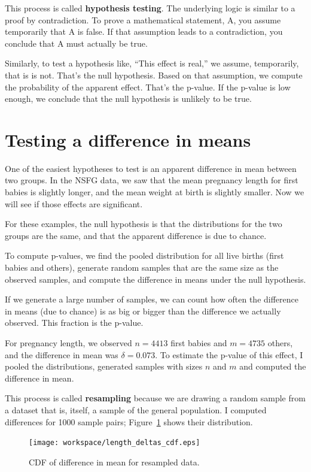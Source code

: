 \documentclass[12pt]{book}
\begin{document}
This process is called {\bf hypothesis testing}.  The underlying
logic is similar to a proof by contradiction.  To prove a mathematical
statement, A, you assume temporarily that A is false.  If that
assumption leads to a contradiction, you conclude that A must actually
be true.

Similarly, to test a hypothesis like, ``This effect is real,'' we
assume, temporarily, that is is not.  That's the null hypothesis.
Based on that assumption, we compute the probability of the apparent
effect.  That's the p-value.  If the p-value is low enough, we
conclude that the null hypothesis is unlikely to be true.


\section{Testing a difference in means}

One of the easiest hypotheses to test is an apparent difference in mean
between two groups.  In the NSFG data, we saw that the mean pregnancy
length for first babies is slightly longer, and the mean weight at
birth is slightly smaller.  Now we will see if those effects are
significant.

For these examples, the null hypothesis is that the distributions
for the two groups are the same, and that the apparent difference is
due to chance.

To compute p-values, we find the pooled distribution for all live
births (first babies and others), generate random samples that are
the same size as the observed samples, and compute the difference
in means under the null hypothesis.

If we generate a large number of samples, we can count how often the
difference in means (due to chance) is as big or bigger than the
difference we actually observed.  This fraction is the p-value.

For pregnancy length, we observed $n=4413$ first babies and $m=4735$
others, and the difference in mean was $\delta=0.073$.  To estimate
the p-value of this effect, I pooled the distributions, generated
samples with sizes $n$ and $m$ and computed the difference in mean.

This process is called {\bf resampling} because we are drawing a
random sample from a dataset that is, itself, a sample of the general
population.  I computed differences for 1000 sample pairs;
Figure~\ref{length_deltas_cdf} shows their distribution.

\begin{figure}
\centerline{\texttt{[image: workspace/length\_deltas\_cdf.eps]}}
\caption{CDF of difference in mean for resampled data.}
\label{length_deltas_cdf}
\end{figure}
\end{document}
